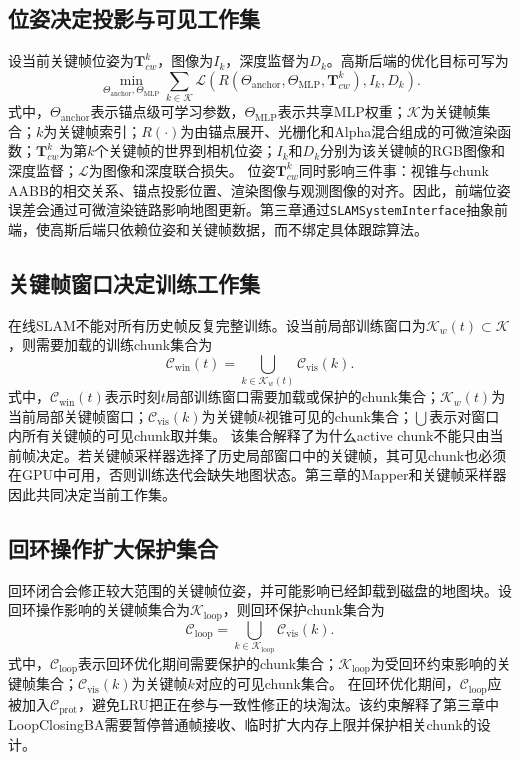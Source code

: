 \subsection{位姿决定投影与可见工作集}

设当前关键帧位姿为$\mathbf{T}_{cw}^k$，图像为$I_k$，深度监督为$D_k$。高斯后端的优化目标可写为
\begin{equation}
\min_{\Theta_{\mathrm{anchor}},\Theta_{\mathrm{MLP}}}
\sum_{k\in\mathcal{K}}
\mathcal{L}\left(
R(\Theta_{\mathrm{anchor}},\Theta_{\mathrm{MLP}},\mathbf{T}_{cw}^{k}),
I_k,D_k
\right).
\end{equation}
式中，$\Theta_{\mathrm{anchor}}$表示锚点级可学习参数，$\Theta_{\mathrm{MLP}}$表示共享MLP权重；$\mathcal{K}$为关键帧集合；$k$为关键帧索引；$R(\cdot)$为由锚点展开、光栅化和Alpha混合组成的可微渲染函数；$\mathbf{T}_{cw}^{k}$为第$k$个关键帧的世界到相机位姿；$I_k$和$D_k$分别为该关键帧的RGB图像和深度监督；$\mathcal{L}$为图像和深度联合损失。
位姿$\mathbf{T}_{cw}^{k}$同时影响三件事：视锥与chunk AABB的相交关系、锚点投影位置、渲染图像与观测图像的对齐。因此，前端位姿误差会通过可微渲染链路影响地图更新。第三章通过\texttt{SLAMSystemInterface}抽象前端，使高斯后端只依赖位姿和关键帧数据，而不绑定具体跟踪算法。

\subsection{关键帧窗口决定训练工作集}

在线SLAM不能对所有历史帧反复完整训练。设当前局部训练窗口为$\mathcal{K}_{w}(t)\subset\mathcal{K}$，则需要加载的训练chunk集合为
\begin{equation}
\mathcal{C}_{\mathrm{win}}(t)
=
\bigcup_{k\in\mathcal{K}_{w}(t)}
\mathcal{C}_{\mathrm{vis}}(k).
\end{equation}
式中，$\mathcal{C}_{\mathrm{win}}(t)$表示时刻$t$局部训练窗口需要加载或保护的chunk集合；$\mathcal{K}_{w}(t)$为当前局部关键帧窗口；$\mathcal{C}_{\mathrm{vis}}(k)$为关键帧$k$视锥可见的chunk集合；$\bigcup$表示对窗口内所有关键帧的可见chunk取并集。
该集合解释了为什么active chunk不能只由当前帧决定。若关键帧采样器选择了历史局部窗口中的关键帧，其可见chunk也必须在GPU中可用，否则训练迭代会缺失地图状态。第三章的Mapper和关键帧采样器因此共同决定当前工作集。

\subsection{回环操作扩大保护集合}

回环闭合会修正较大范围的关键帧位姿，并可能影响已经卸载到磁盘的地图块。设回环操作影响的关键帧集合为$\mathcal{K}_{\mathrm{loop}}$，则回环保护chunk集合为
\begin{equation}
\mathcal{C}_{\mathrm{loop}}
=
\bigcup_{k\in\mathcal{K}_{\mathrm{loop}}}
\mathcal{C}_{\mathrm{vis}}(k).
\end{equation}
式中，$\mathcal{C}_{\mathrm{loop}}$表示回环优化期间需要保护的chunk集合；$\mathcal{K}_{\mathrm{loop}}$为受回环约束影响的关键帧集合；$\mathcal{C}_{\mathrm{vis}}(k)$为关键帧$k$对应的可见chunk集合。
在回环优化期间，$\mathcal{C}_{\mathrm{loop}}$应被加入$\mathcal{C}_{\mathrm{prot}}$，避免LRU把正在参与一致性修正的块淘汰。该约束解释了第三章中LoopClosingBA需要暂停普通帧接收、临时扩大内存上限并保护相关chunk的设计。

